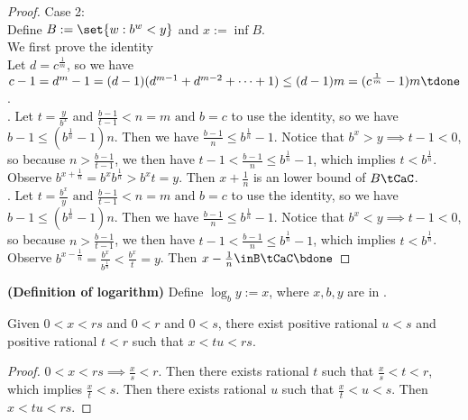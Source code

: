 \documentclass{report}
\begin{document}
\begin{proof}
Case 2: \\

Define $B:=\set{w:b^w<y}$ and $x:=\inf B$.\\

We first prove the identity \\

Let $d=c^{\frac{1}{m}}$, so we have $c-1=d^m-1=(d-1)(d^{m-1}+d^{m-2}+\cdots +1)\leq (d-1)m=(c^{\frac{1}{m}}-1)m\tdone$.\\

. Let $t=\frac{y}{b^x}$ and $\frac{b-1}{t-1}<n=m\text{ and }b=c$ to use the identity, so we have $b-1\leq (b^{\frac{1}{n}}-1)n$. Then we have $\frac{b-1}{n}\leq b^{\frac{1}{n}}-1$. Notice that $b^x>y\implies t-1<0$, so because $n>\frac{b-1}{t-1}$, we then have $t-1<\frac{b-1}{n}\leq b^{\frac{1}{n}}-1$, which implies $t<b^{\frac{1}{n}}$.\\

Observe $b^{x+\frac{1}{n}}=b^xb^{\frac{1}{n}}>b^xt=y$. Then $x+\frac{1}{n}$ is an lower bound of $B\tCaC$.\\

. Let $t=\frac{b^x}{y}\text{ and }\frac{b-1}{t-1}<n=m\text{ and }b=c$ to use the identity, so we have $b-1\leq (b^{\frac{1}{n}}-1)n$. Then we have $\frac{b-1}{n}\leq b^{\frac{1}{n}}-1$. Notice that $b^x<y\implies t-1<0$, so because $n>\frac{b-1}{t-1}$, we then have $t-1<\frac{b-1}{n}\leq b^{\frac{1}{n}}-1$, which implies $t<b^{\frac{1}{n}}$.\\

Observe $b^{x-\frac{1}{n}}=\frac{b^x}{b^{\frac{1}{n}}}<\frac{b^x}{t}=y$. Then $x-\frac{1}{n}\inB\tCaC\bdone$
\end{proof}
\begin{definition}
\label{1.4.12}
\textbf{(Definition of logarithm)} Define $\log_b y:=x$, where $x,b,y$ are in .
\end{definition}
\begin{lemma}
\label{1.4.13}
Given $0<x<rs$ and $0<r$ and  $0<s$, there exist positive rational $u<s$ and positive rational $t<r$ such that   $x<tu<rs$. 
\end{lemma}
\begin{proof}
  $0<x<rs \implies \frac{x}{s}<r$. Then there exists rational $t$ such that  $\frac{x}{s}<t<r$, which implies $\frac{x}{t}<s$. Then there exists rational $u$ such that $\frac{x}{t}<u<s$. Then $x<tu<rs$.
\end{proof}
\end{document}

